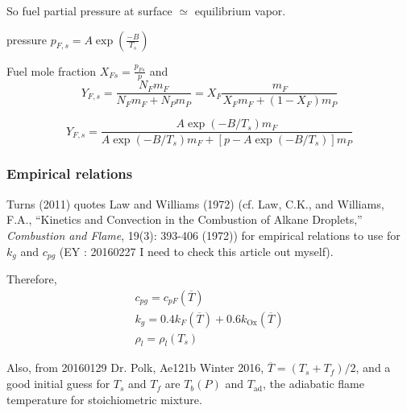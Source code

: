 \documentclass[10pt]{amsart}
\begin{document}
\begin{multicols*}{2}
So fuel partial pressure at surface $\simeq $ equilibrium vapor.  

pressure $p_{F,s} = A\exp{ \left( \frac{-B}{T_s} \right) }$

Fuel mole fraction $X_{Fs} = \frac{p_{Fs}}{p}$ and 
\[
Y_{F,s} = \frac{N_F m_F}{ N_F m_F + N_P m_P } = X_F \frac{m_F}{ X_F m_F + (1-X_F)m_P }
\]

\begin{equation}\label{Eq:DropletV}
  \boxed{ Y_{F,s} = \frac{A \exp{ (-B/T_s) } m_F }{ A\exp{ (-B/T_s) }m_F + [p- A \exp{ (-B/T_s) }]m_P } }
\end{equation}


\subsubsection{Empirical relations}

Turns (2011) \cite{STurns2011} quotes Law and Williams (1972) (cf. Law, C.K., and Williams, F.A., ``Kinetics and Convection in the Combustion of Alkane Droplets,'' \emph{Combustion and Flame}, 19(3): 393-406 (1972)) for empirical relations to use for $k_g$ and $c_{pg}$ (EY : 20160227 I need to check this article out myself).  

Therefore, 
\begin{equation}
  \boxed{
\begin{gathered}
  c_{pg} = c_{pF}(\overline{T}) \\ 
  k_g = 0.4 k_F(\overline{T}) + 0.6 k_{\text{Ox}}(\overline{T}) \\ 
  \rho_l = \rho_l(T_s)
\end{gathered}
}
\end{equation}

Also, from 20160129 Dr. Polk, Ae121b Winter 2016, $\overline{T} = (T_s + T_f)/2$, and a good initial guess for $T_s$ and $T_f$ are $T_b(P)$ and $T_{\text{ad}}$, the adiabatic flame temperature for stoichiometric mixture.  







\end{multicols*}
\end{document}
